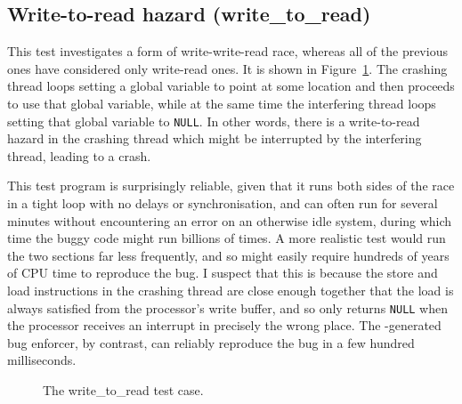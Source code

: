 \subsection{Write-to-read hazard (write\_to\_read)}


This test investigates a form of write-write-read race, whereas all of
the previous ones have considered only write-read ones.  It is shown
in Figure~\ref{fig:eval:write_to_read}.  The crashing thread loops
setting a global variable to point at some location and then proceeds
to use that global variable, while at the same time the interfering
thread loops setting that global variable to \texttt{NULL}.  In other
words, there is a write-to-read hazard in the crashing thread which
might be interrupted by the interfering thread, leading to a crash.

This test program is surprisingly reliable, given that it runs both
sides of the race in a tight loop with no delays or synchronisation,
and can often run for several minutes without encountering an error on
an otherwise idle system, during which time the buggy code might run
billions of times.  A more realistic test would run the two sections
far less frequently, and so might easily require hundreds of years of
CPU time to reproduce the bug.  I suspect that this is because the
store and load instructions in the crashing thread are close enough
together that the load is always satisfied from the processor's write
buffer, and so only returns \texttt{NULL} when the processor receives
an interrupt in precisely the wrong place.  The {\technique}-generated
bug enforcer, by contrast, can reliably reproduce the bug in a few
hundred milliseconds.

\begin{figure}
  \centerline{
    {\hfill}
  \hfill
    {\hfill}
    }
  \caption{The write\_to\_read test case.}
  \label{fig:eval:write_to_read}
\end{figure}

